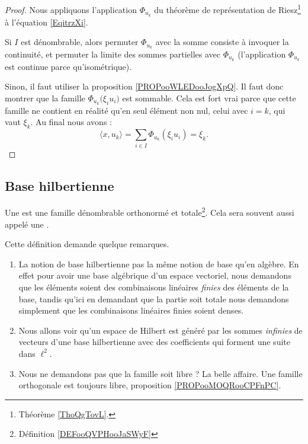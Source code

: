 \begin{proof}
    Nous appliquons l'application \( \Phi_{u_k}\) du théorème de représentation de Riesz\footnote{Théorème \ref{ThoQgTovL}.} à l'équation \eqref{EqitrzXi}.

    Si \( I\) est dénombrable, alors permuter \( \Phi_{u_k}\) avec la somme consiste à invoquer la continuité, et permuter la limite des sommes partielles avec \( \Phi_{u_k}\) (l'application \( \Phi_{u_k}\) est continue parce qu'isométrique).

    Sinon, il faut utiliser la proposition \ref{PROPooWLEDooJogXpQ}. Il faut donc montrer que la famille \( \Phi_{u_k}\big( \xi_iu_i \big)\) est sommable. Cela est fort vrai parce que cette famille ne contient en réalité qu'en seul élément non nul, celui avec \( i=k\), qui vaut \( \xi_k\). Au final nous avons :
    \begin{equation}
        \langle x, u_k\rangle =\sum_{i\in I}\Phi_{u_k}(\xi_iu_i)=\xi_k.
    \end{equation}
\end{proof}

\subsection{Base hilbertienne}

\begin{definition}      \label{DEFooADQXooFoIhTG}
    Une  est une famille dénombrable orthonormé et totale\footnote{Définition \ref{DEFooQVPHooJaSWyF}}. Cela sera souvent aussi appelé une .
\end{definition}

\begin{normaltext}
    Cette définition demande quelque remarques.

    \begin{enumerate}
        \item
            La notion de base hilbertienne pas la même notion de base qu'en algèbre. En effet pour avoir une base algébrique d'un espace vectoriel, nous demandons que les éléments soient des combinaisons linéaires \emph{finies} des éléments de la base, tandis qu'ici en demandant que la partie soit totale nous demandons simplement que les combinaisons linéaires finies soient denses.
        \item
            Nous allons voir qu'un espace de Hilbert est généré par les sommes \emph{infinies} de vecteurs d'une base hilbertienne avec des coefficients qui forment une suite dans \( \ell^2\).
        \item
            Nous ne demandons pas que la famille soit libre ? La belle affaire. Une famille orthogonale est toujours libre, proposition \ref{PROPooMOQRooCPFnPC}.
    \end{enumerate}
\end{normaltext}

